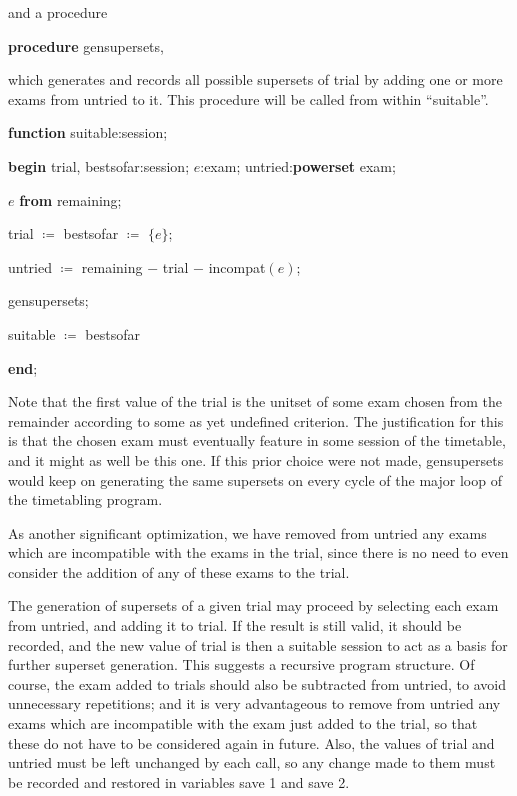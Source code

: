 \noindent
and a procedure

\quad \textbf{procedure} gensupersets,

\noindent
which generates and records all possible supersets of trial by adding one or more exams from untried to it. This procedure will be called from within ``suitable''.

\quad \textbf{function} suitable:session;

\quad \quad \textbf{begin} trial, bestsofar:session; $e$:exam; untried:\textbf{powerset} exam;

\quad \quad \quad $e$ \textbf{from} remaining;

\quad \quad \quad trial $\coloneq$ bestsofar $\coloneq$ $\{e\}$;

\quad \quad \quad untried $\coloneq$ remaining $-$ trial $-$ incompat$(e)$;

\quad \quad \quad gensupersets;

\quad \quad \quad suitable $\coloneq$ bestsofar

\quad \quad \textbf{end};

\noindent
Note that the first value of the trial is the unitset of some exam chosen from the remainder according to some as yet undefined criterion. The justification for this is that the chosen exam must eventually feature in some session of the timetable, and it might as well be this one. If this prior choice were not made, gensupersets would keep on generating the same supersets on every cycle of the major loop of the timetabling program.

As another significant optimization, we have removed from untried any exams which are incompatible with the exams in the trial, since there is no need to even consider the addition of any of these exams to the trial.

The generation of supersets of a given trial may proceed by selecting each exam from untried, and adding it to trial. If the result is still valid, it should be recorded, and the new value of trial is then a suitable session to act as a basis for further superset generation. This suggests a recursive program structure. Of course, the exam added to trials should also be subtracted from untried, to avoid unnecessary repetitions; and it is very advantageous to remove from untried any exams which are incompatible with the exam just added to the trial, so that these do not have to be considered again in future. Also, the values of trial and untried must be left unchanged by each call, so any change made to them must be recorded and restored in variables save 1 and save 2.

